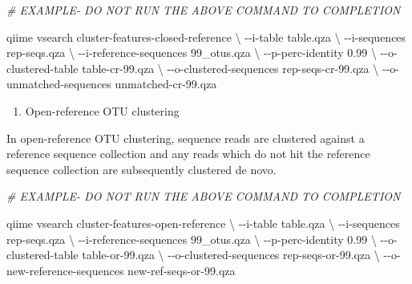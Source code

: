 \documentclass[
]{book}
\newenvironment{Shaded}{\begin{snugshade}}{\end{snugshade}}
\newcommand{\CommentTok}[1]{\textcolor[rgb]{0.56,0.35,0.01}{\textit{#1}}}
\newcommand{\DataTypeTok}[1]{\textcolor[rgb]{0.13,0.29,0.53}{#1}}
\newcommand{\ExtensionTok}[1]{#1}
\newcommand{\NormalTok}[1]{#1}
\providecommand{\tightlist}{%
  \setlength{\itemsep}{0pt}\setlength{\parskip}{0pt}}
\begin{document}
\begin{Shaded}
\begin{Highlighting}[]

\CommentTok{\# EXAMPLE{-} DO NOT RUN THE ABOVE COMMAND TO COMPLETION}

\ExtensionTok{qiime}\NormalTok{ vsearch cluster{-}features{-}closed{-}reference }\DataTypeTok{\textbackslash{}}
\NormalTok{{-}{-}i{-}table table.qza }\DataTypeTok{\textbackslash{}}
\NormalTok{{-}{-}i{-}sequences rep{-}seqs.qza }\DataTypeTok{\textbackslash{}}
\NormalTok{{-}{-}i{-}reference{-}sequences 99\_otus.qza }\DataTypeTok{\textbackslash{}}
\NormalTok{{-}{-}p{-}perc{-}identity 0.99 }\DataTypeTok{\textbackslash{}}
\NormalTok{{-}{-}o{-}clustered{-}table table{-}cr{-}99.qza }\DataTypeTok{\textbackslash{}}
\NormalTok{{-}{-}o{-}clustered{-}sequences rep{-}seqs{-}cr{-}99.qza }\DataTypeTok{\textbackslash{}}
\NormalTok{{-}{-}o{-}unmatched{-}sequences unmatched{-}cr{-}99.qza}
\end{Highlighting}
\end{Shaded}

\begin{enumerate}
\def\labelenumi{\Roman{enumi}.}
\setcounter{enumi}{2}
\tightlist
\item
  Open-reference OTU clustering
\end{enumerate}

In open-reference OTU clustering, sequence reads are clustered against a reference sequence collection and any reads which do not hit the reference sequence collection are subsequently clustered de novo.

\begin{Shaded}
\begin{Highlighting}[]

\CommentTok{\# EXAMPLE{-} DO NOT RUN THE ABOVE COMMAND TO COMPLETION}

\ExtensionTok{qiime}\NormalTok{ vsearch cluster{-}features{-}open{-}reference }\DataTypeTok{\textbackslash{}}
\NormalTok{{-}{-}i{-}table table.qza }\DataTypeTok{\textbackslash{}}
\NormalTok{{-}{-}i{-}sequences rep{-}seqs.qza }\DataTypeTok{\textbackslash{}}
\NormalTok{{-}{-}i{-}reference{-}sequences 99\_otus.qza }\DataTypeTok{\textbackslash{}}
\NormalTok{{-}{-}p{-}perc{-}identity 0.99 }\DataTypeTok{\textbackslash{}}
\NormalTok{{-}{-}o{-}clustered{-}table table{-}or{-}99.qza }\DataTypeTok{\textbackslash{}}
\NormalTok{{-}{-}o{-}clustered{-}sequences rep{-}seqs{-}or{-}99.qza }\DataTypeTok{\textbackslash{}}
\NormalTok{{-}{-}o{-}new{-}reference{-}sequences new{-}ref{-}seqs{-}or{-}99.qza}
\end{Highlighting}
\end{Shaded}
\end{document}
